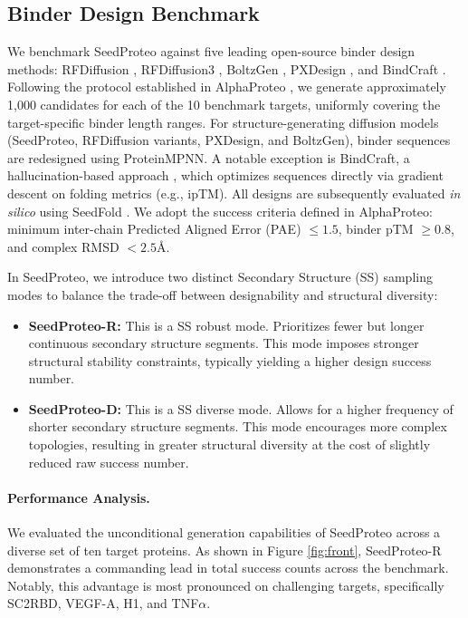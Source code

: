 \documentclass[]{bytedance_seed}
\begin{document}
\subsection{Binder Design Benchmark}
We benchmark SeedProteo against five leading open-source binder design methods: RFDiffusion \cite{watsonNovoDesignProtein2023}, RFDiffusion3 \cite{butcher2025novo}, BoltzGen \cite{starkUniversalBinderDesign}, PXDesign \cite{ren2025pxdesign}, and BindCraft \cite{pacesaOneshotDesignFunctional2025}. Following the protocol established in AlphaProteo \cite{zambaldi2024novo}, we generate approximately 1,000 candidates for each of the 10 benchmark targets, uniformly covering the target-specific binder length ranges. For structure-generating diffusion models (SeedProteo, RFDiffusion variants, PXDesign, and BoltzGen), binder sequences are redesigned using ProteinMPNN. A notable exception is BindCraft, a hallucination-based approach \cite{anishchenkoNovoProteinDesign2021}, which optimizes sequences directly via gradient descent on folding metrics (e.g., ipTM). All designs are subsequently evaluated \textit{in silico} using SeedFold \cite{seedfold}. We adopt the success criteria defined in AlphaProteo: minimum inter-chain Predicted Aligned Error (PAE) $\le 1.5$, binder pTM $\ge0.8$, and complex RMSD $<2.5$\AA.

In SeedProteo, we introduce two distinct Secondary Structure (SS) sampling modes to balance the trade-off between designability and structural diversity: 
\begin{itemize} 
    \item \textbf{SeedProteo-R:} This is a SS robust mode. Prioritizes fewer but longer continuous secondary structure segments. This mode imposes stronger structural stability constraints, typically yielding a higher design success number. 
    
    \item \textbf{SeedProteo-D:} This is a SS diverse mode. Allows for a higher frequency of shorter secondary structure segments. This mode encourages more complex topologies, resulting in greater structural diversity at the cost of slightly reduced raw success number. 
\end{itemize}


\paragraph{Performance Analysis.} We evaluated the unconditional generation capabilities of SeedProteo across a diverse set of ten target proteins. As shown in Figure \ref{fig:front}, SeedProteo-R demonstrates a commanding lead in total success counts across the benchmark. Notably, this advantage is most pronounced on challenging targets, specifically SC2RBD, VEGF-A, H1, and TNF$\alpha$.
\end{document}
